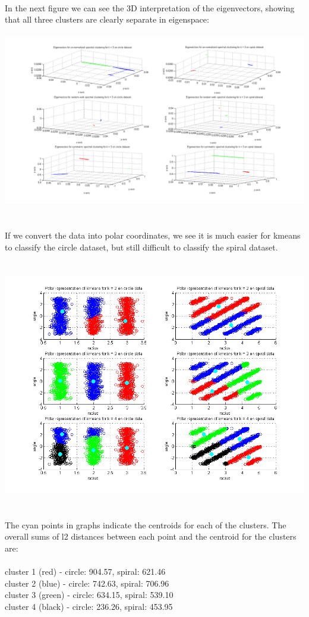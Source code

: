 \documentclass[paper=a4, fontsize=11pt]{scrartcl} %
\numberwithin{equation}{section} %
\numberwithin{figure}{section} %
\numberwithin{table}{section} %
\begin{document}
	\\\\\\
	In the next figure we can see the 3D interpretation of the eigenvectors, showing that all three clusters are clearly separate in eigenspace:
	\\\\
	\hspace*{-4.3cm}\includegraphics[scale=0.55]{3dplots}
	\\\\\\
	If we convert the data into polar coordinates, we see it is much easier for kmeans to classify the circle dataset, but still difficult to classify the spiral dataset.
	\\\\\\
	\hspace*{-3cm}\includegraphics[scale=0.8]{polar_kmeans}
	\\\\\\
	The cyan points in graphs indicate the centroids for each of the clusters. The overall sums of l2 distances between each point and the centroid for the clusters are:
	\\\\
	cluster 1 (red) - circle: 904.57, spiral: 621.46\\
	cluster 2 (blue) - circle: 742.63, spiral: 706.96\\
	cluster 3 (green) - circle: 634.15, spiral: 539.10\\
	cluster 4 (black) - circle: 236.26, spiral: 453.95
	
\end{document}
